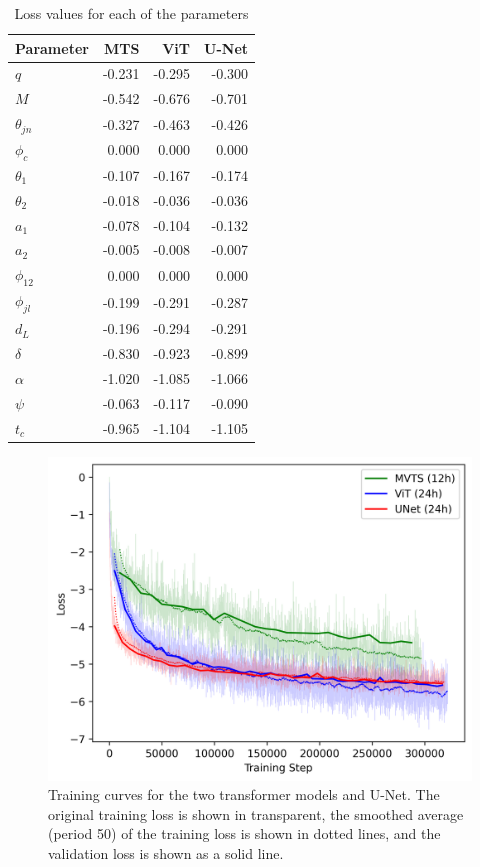 \begin{table}
    \caption{Loss values for each of the parameters}
    \begin{tabular}{lrrr}
    \toprule
    Parameter & MTS & ViT & U-Net \\
    \midrule
    $q$ & -0.231 & -0.295 & -0.300 \\
    $M$ & -0.542 & -0.676 & -0.701 \\
    $\theta_{jn}$ & -0.327 & -0.463 & -0.426 \\
    $\phi_c$ & 0.000 & 0.000 & 0.000 \\
    $\theta_1$ & -0.107 & -0.167 & -0.174 \\
    $\theta_2$ & -0.018 & -0.036 & -0.036 \\
    $a_1$ & -0.078 & -0.104 & -0.132 \\
    $a_2$ & -0.005 & -0.008 & -0.007 \\
    $\phi_{12}$ & 0.000 & 0.000 & 0.000 \\
    $\phi_{jl}$ & -0.199 & -0.291 & -0.287 \\
    $d_L$ & -0.196 & -0.294 & -0.291 \\
    $\delta$ & -0.830 & -0.923 & -0.899 \\
    $\alpha$ & -1.020 & -1.085 & -1.066 \\
    $\psi$ & -0.063 & -0.117 & -0.090 \\
    $t_c$ & -0.965 & -1.104 & -1.105 \\
    \bottomrule
    \end{tabular}
\end{table}


\begin{figure}
  \centering
  \includegraphics[width=1\linewidth]{media/images/Pretraining_loss_curve.png}
  \caption{Training curves for the two transformer models and U-Net. The original training loss is shown in transparent, the smoothed average (period 50) of the training loss is shown in dotted lines, and the validation loss is shown as a solid line.}
  \label{fig:pretain_loss_curve}
\end{figure}

